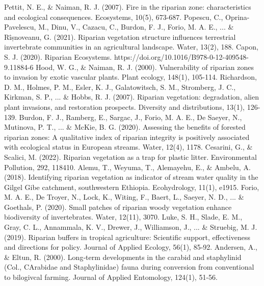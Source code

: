 \documentclass[12pt,a4wide]{report}
\numberwithin{equation}{chapter}
\numberwithin{theorem}{chapter}
\begin{document}
\begin{thebibliography}{99}
	\vspace{-1cm}
  Pettit, N. E., \& Naiman, R. J. (2007). Fire in the riparian zone: characteristics and ecological consequences. Ecosystems, 10(5), 673-687.
  Popescu, C., Oprina-Pavelescu, M., Dinu, V., Cazacu, C., Burdon, F. J., Forio, M. A. E., ... \& Rîșnoveanu, G. (2021). Riparian vegetation structure influences terrestrial invertebrate communities in an agricultural landscape. Water, 13(2), 188.
  Capon, S. J. (2020). Riparian Ecosystems. https://doi.org/10.1016/B978-0-12-409548-9.11884-6
  Hood, W. G., \& Naiman, R. J. (2000). Vulnerability of riparian zones to invasion by exotic vascular plants. Plant ecology, 148(1), 105-114.
  Richardson, D. M., Holmes, P. M., Esler, K. J., Galatowitsch, S. M., Stromberg, J. C., Kirkman, S. P., ... \& Hobbs, R. J. (2007). Riparian vegetation: degradation, alien plant invasions, and restoration prospects. Diversity and distributions, 13(1), 126-139.
  Burdon, F. J., Ramberg, E., Sargac, J., Forio, M. A. E., De Saeyer, N., Mutinova, P. T., ... \& McKie, B. G. (2020). Assessing the benefits of forested riparian zones: A qualitative index of riparian integrity is positively associated with ecological status in European streams. Water, 12(4), 1178.
  Cesarini, G., \& Scalici, M. (2022). Riparian vegetation as a trap for plastic litter. Environmental Pollution, 292, 118410.
  Alemu, T., Weyuma, T., Alemayehu, E., \& Ambelu, A. (2018). Identifying riparian vegetation as indicator of stream water quality in the Gilgel Gibe catchment, southwestern Ethiopia. Ecohydrology, 11(1), e1915.
  Forio, M. A. E., De Troyer, N., Lock, K., Witing, F., Baert, L., Saeyer, N. D., ... \& Goethals, P. (2020). Small patches of riparian woody vegetation enhance biodiversity of invertebrates. Water, 12(11), 3070.
  Luke, S. H., Slade, E. M., Gray, C. L., Annammala, K. V., Drewer, J., Williamson, J., ... \& Struebig, M. J. (2019). Riparian buffers in tropical agriculture: Scientific support, effectiveness and directions for policy. Journal of Applied Ecology, 56(1), 85-92.
  Andersen, A., \& Eltun, R. (2000). Long‐term developments in the carabid and staphylinid (Col., CArabidae and Staphylinidae) fauna during conversion from conventional to bilogivcal farming. Journal of Applied Entomology, 124(1), 51-56.

\end{thebibliography}
\end{document}
